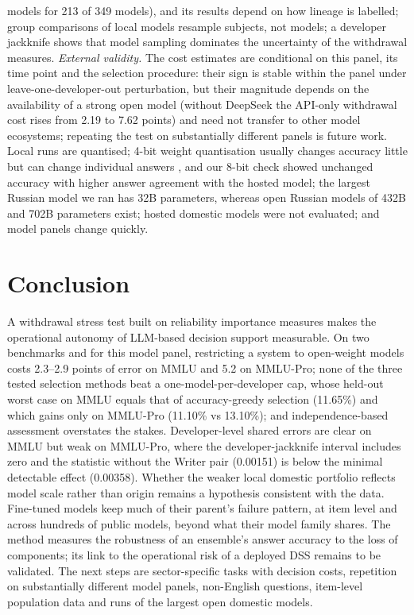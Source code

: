 \documentclass[preprint,12pt,authoryear]{elsarticle}
\begin{document}
models for 213 of 349 models), and its results depend on how lineage is labelled; group comparisons of local models resample subjects, not models; a developer jackknife shows that model sampling dominates the uncertainty of the withdrawal measures. \emph{External validity.} The cost estimates are conditional on this panel, its time point and the selection procedure: their sign is stable within the panel under leave-one-developer-out perturbation, but their magnitude depends on the availability of a strong open model (without DeepSeek the API-only withdrawal cost rises from 2.19 to 7.62 points) and need not transfer to other model ecosystems; repeating the test on substantially different panels is future work. Local runs are quantised; 4-bit weight quantisation usually changes accuracy little but can change individual answers \citep{li2024quant}, and our 8-bit check showed unchanged accuracy with higher answer agreement with the hosted model; the largest Russian model we ran has 32B parameters, whereas open Russian models of 432B and 702B parameters exist; hosted domestic models were not evaluated; and model panels change quickly.

\section{Conclusion}
A withdrawal stress test built on reliability importance measures makes the operational autonomy of LLM-based decision support measurable. On two benchmarks and for this model panel, restricting a system to open-weight models costs 2.3--2.9 points of error on MMLU and 5.2 on MMLU-Pro; none of the three tested selection methods beat a one-model-per-developer cap, whose held-out worst case on MMLU equals that of accuracy-greedy selection (11.65\%) and which gains only on MMLU-Pro (11.10\% vs 13.10\%); and independence-based assessment overstates the stakes. Developer-level shared errors are clear on MMLU but weak on MMLU-Pro, where the developer-jackknife interval includes zero and the statistic without the Writer pair (0.00151) is below the minimal detectable effect (0.00358). Whether the weaker local domestic portfolio reflects model scale rather than origin remains a hypothesis consistent with the data. Fine-tuned models keep much of their parent's failure pattern, at item level and across hundreds of public models, beyond what their model family shares. The method measures the robustness of an ensemble's answer accuracy to the loss of components; its link to the operational risk of a deployed DSS remains to be validated. The next steps are sector-specific tasks with decision costs, repetition on substantially different model panels, non-English questions, item-level population data and runs of the largest open domestic models.
\end{document}
